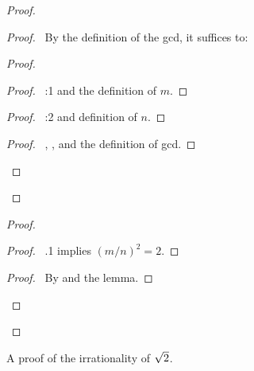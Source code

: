 \begin{figure}[p]
\begin{proof}
\begin{proof}
  \pf\ By the definition of the gcd, it suffices
  to:
  \begin{proof}
      \begin{proof}
        \pf\ :1 and the definition of $m$.
      \end{proof}
      \begin{proof}
        \pf\ :2 and definition of $n$.
      \end{proof}
    \qedstep
    \begin{proof}
      \pf\ , , and the definition of gcd.
    \end{proof}

  \end{proof} %

  \qedstep
\end{proof} %

\begin{proof}
  \begin{proof}
    \pf\ .1 implies $(m/n)^{2}=2$.  
  \end{proof}
  \qedstep
  \begin{proof}
     \pf\ By  and the lemma.
  \end{proof}
\end{proof} %

\end{proof}
\normalsize
\caption{A proof of the irrationality
         of $\protect\sqrt{2}$.}
\label{fig:complete-proof}
\end{figure}

